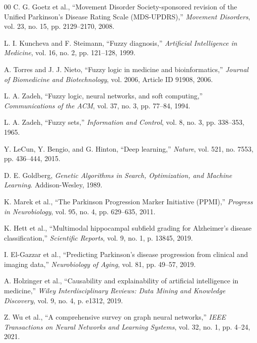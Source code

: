 \documentclass[conference]{IEEEtran}
\begin{document}
{{{\begin{thebibliography}{00}
C. G. Goetz et al., ``Movement Disorder Society-sponsored revision of the Unified Parkinson's Disease Rating Scale (MDS-UPDRS),'' \textit{Movement Disorders}, vol. 23, no. 15, pp. 2129--2170, 2008.

L. I. Kuncheva and F. Steimann, ``Fuzzy diagnosis,'' \textit{Artificial Intelligence in Medicine}, vol. 16, no. 2, pp. 121--128, 1999.

A. Torres and J. J. Nieto, ``Fuzzy logic in medicine and bioinformatics,'' \textit{Journal of Biomedicine and Biotechnology}, vol. 2006, Article ID 91908, 2006.

L. A. Zadeh, ``Fuzzy logic, neural networks, and soft computing,'' \textit{Communications of the ACM}, vol. 37, no. 3, pp. 77--84, 1994.

L. A. Zadeh, ``Fuzzy sets,'' \textit{Information and Control}, vol. 8, no. 3, pp. 338--353, 1965.

Y. LeCun, Y. Bengio, and G. Hinton, ``Deep learning,'' \textit{Nature}, vol. 521, no. 7553, pp. 436--444, 2015.

D. E. Goldberg, \textit{Genetic Algorithms in Search, Optimization, and Machine Learning}. Addison-Wesley, 1989.

K. Marek et al., ``The Parkinson Progression Marker Initiative (PPMI),'' \textit{Progress in Neurobiology}, vol. 95, no. 4, pp. 629--635, 2011.

K. Hett et al., ``Multimodal hippocampal subfield grading for Alzheimer's disease classification,'' \textit{Scientific Reports}, vol. 9, no. 1, p. 13845, 2019.

I. El-Gazzar et al., ``Predicting Parkinson's disease progression from clinical and imaging data,'' \textit{Neurobiology of Aging}, vol. 81, pp. 49--57, 2019.

A. Holzinger et al., ``Causability and explainability of artificial intelligence in medicine,'' \textit{Wiley Interdisciplinary Reviews: Data Mining and Knowledge Discovery}, vol. 9, no. 4, p. e1312, 2019.

Z. Wu et al., ``A comprehensive survey on graph neural networks,'' \textit{IEEE Transactions on Neural Networks and Learning Systems}, vol. 32, no. 1, pp. 4--24, 2021.


\end{thebibliography}}}}
\end{document}
